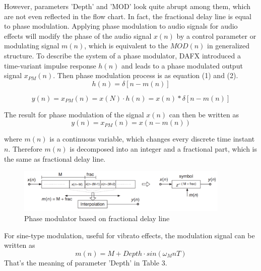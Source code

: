 \documentclass[a4paper]{tufte-handout} %
\begin{document}
However, parameters 'Depth' and 'MOD' look quite abrupt among them, which are not even reflected in the flow chart. In fact, the fractional delay line is equal to phase modulation. Applying phase modulation to audio signals for audio effects will modify the phase of the audio signal $x(n)$ by a control parameter or modulating signal $m(n)$, which is equivalent to the $MOD(n)$ in generalized structure. To describe the system of a phase modulator, DAFX introduced a time-variant impulse response $h(n)$ and leads to a phase modulated output signal $x_{PM}(n)$. Then phase modulation process is as equation (1) and (2).
\begin{equation}
h(n)=\delta[n-m(n)]
\end{equation}

\begin{equation}
y(n)=x_{PM}(n)=x(N)·h(n)=x(n) \ast \delta[n-m(n)]
\end{equation}

The result for phase modulation of the signal $x(n)$ can then be written as 
\begin{equation}
y(n)=x_{PM}(n)=x(n-m(n))
\end{equation}

where $m(n)$ is a continuous variable, which changes every discrete time instant $n$. Therefore $m(n)$ is decomposed into an integer and a fractional part, which is the same as fractional delay line.
\begin{figure}[h]
    \centering
	\includegraphics[width=4in]{Image/PhaseModulation.png}
	\caption{Phase modulator based on fractional delay line}
	\label{fig:textfig}
\end{figure}

For sine-type modulation, useful for vibrato effects, the modulation signal can be written as
\begin{equation}
m(n)=M+Depth \cdot sin(\omega_MnT)
\end{equation}
That's the meaning of parameter 'Depth' in Table 3.
\end{document}
